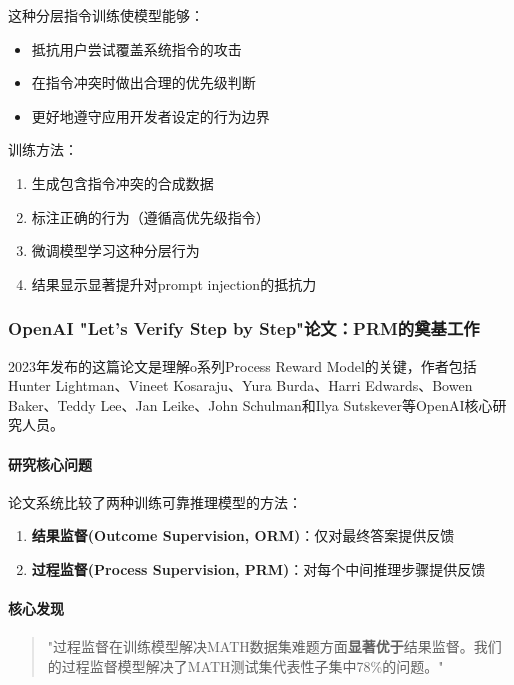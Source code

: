 \documentclass[12pt,a4paper]{article}
\begin{document}
这种分层指令训练使模型能够：

\begin{itemize}
    \item 抵抗用户尝试覆盖系统指令的攻击
    \item 在指令冲突时做出合理的优先级判断
    \item 更好地遵守应用开发者设定的行为边界
\end{itemize}

训练方法：

\begin{enumerate}
    \item 生成包含指令冲突的合成数据
    \item 标注正确的行为（遵循高优先级指令）
    \item 微调模型学习这种分层行为
    \item 结果显示显著提升对prompt injection的抵抗力
\end{enumerate}

\subsubsection{OpenAI "Let's Verify Step by Step"论文：PRM的奠基工作}

2023年发布的这篇论文是理解o系列Process Reward Model的关键，作者包括Hunter Lightman、Vineet Kosaraju、Yura Burda、Harri Edwards、Bowen Baker、Teddy Lee、Jan Leike、John Schulman和Ilya Sutskever等OpenAI核心研究人员。

\paragraph{研究核心问题}

论文系统比较了两种训练可靠推理模型的方法：

\begin{enumerate}
    \item \textbf{结果监督(Outcome Supervision, ORM)}：仅对最终答案提供反馈
    \item \textbf{过程监督(Process Supervision, PRM)}：对每个中间推理步骤提供反馈
\end{enumerate}

\paragraph{核心发现}

\begin{quote}
"过程监督在训练模型解决MATH数据集难题方面\textbf{显著优于}结果监督。我们的过程监督模型解决了MATH测试集代表性子集中78\%的问题。"
\end{quote}
\end{document}
